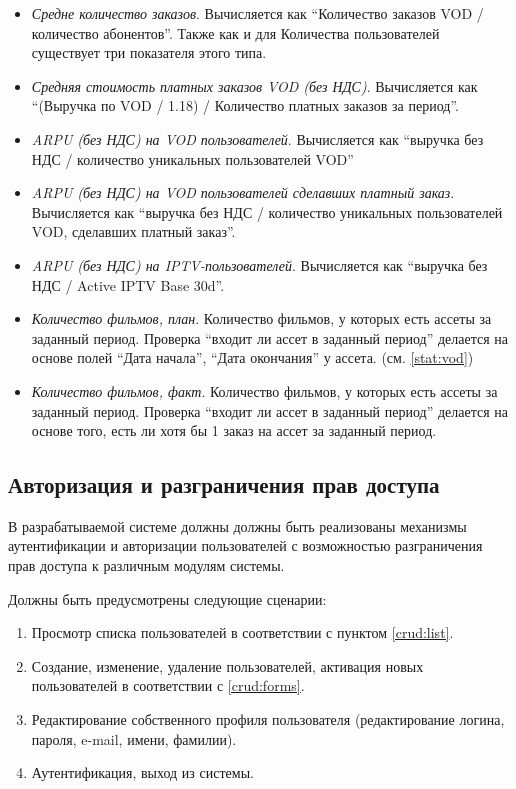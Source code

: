 \begin{itemize}
{}
\item{
\textit{Средне количество заказов}. Вычисляется как
``Количество заказов VOD /  количество абонентов''. Также как и для Количества пользователей существует три показателя этого типа.
}
\item{
\textit{Средняя стоимость платных заказов VOD (без НДС)}. Вычисляется как 
``(Выручка по VOD / 1.18) / Количество платных заказов за период''.
}
\item{
\textit{ARPU (без НДС) на VOD пользователей}. Вычисляется как ``выручка без НДС / количество уникальных пользователей VOD''
}
\item{
\textit{ARPU (без НДС) на VOD пользователей сделавших платный заказ}. 
Вычисляется как ``выручка без НДС / количество уникальных пользователей VOD, сделавших платный заказ''.
}
\item{
\textit{ARPU (без НДС) на IPTV-пользователей}. Вычисляется как ``выручка без НДС / Active IPTV Base 30d''.
}
\item{
\textit{Количество фильмов, план}.
Количество фильмов, у которых есть ассеты за заданный период.
Проверка “входит ли ассет в заданный период” делается на основе полей “Дата начала”, “Дата окончания” у ассета.
(см. \ref{stat:vod})
}
\item{
\textit{Количество фильмов, факт}.
Количество фильмов, у которых есть ассеты за заданный период.
Проверка “входит ли ассет в заданный период” делается на основе того, есть ли хотя бы 1 заказ на ассет за заданный период.
}
\end{itemize}

\subsection{Авторизация и разграничения прав доступа}
В разрабатываемой системе должны должны быть реализованы механизмы аутентификации и авторизации пользователей
с возможностью разграничения прав доступа к различным модулям системы.

Должны быть предусмотрены следующие сценарии:
\begin{enumerate}
\item{
Просмотр списка пользователей в соответствии с пунктом \ref{crud:list}.
}
\item{
Создание, изменение, удаление пользователей, активация новых пользователей в соответствии с \ref{crud:forms}.
}
\item{
Редактирование собственного профиля пользователя (редактирование логина, пароля, e-mail, имени, фамилии).
}
\item{
Аутентификация, выход из системы.
}
\end{enumerate}

